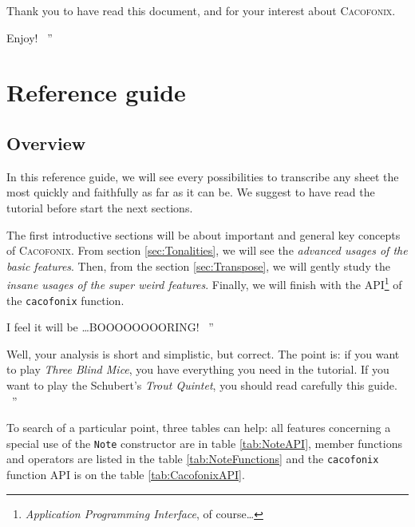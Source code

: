 \documentclass{article}
\newcommand{\cacofonix}{\textsc{Cacofonix}\xspace}
\newcommand{\note}{\lstinline!Note!\xspace}
\newenvironment{meenv}{ \par \noindent \makebox[6em][r]{ \textcolor{mecolor}{Me}: `` --~}}{~''}
\newenvironment{myselfenv}{ \par \noindent \makebox[6em][r]{ \textcolor{myselfcolor}{Myself}: `` --~}}{~''}
\newcommand{ \me }[1]{%
\begin{meenv}%
	#1%
\end{meenv} }
\newcommand{ \myself }[1]{%
\begin{myselfenv}%
	#1%
\end{myselfenv} }
\begin{document}
Thank you to have read this document, and for your interest about \cacofonix.

\myself{Enjoy!}

\section{Reference guide}

\subsection{Overview}

In this reference guide, we will see every possibilities to transcribe any sheet the most quickly and faithfully as far as it can be. We suggest to have read the tutorial before start the next sections.

The first introductive sections will be about important and general key concepts of \cacofonix. From section \ref{sec:Tonalities}, we will see the \emph{advanced usages of the basic features}. Then, from the section \ref{sec:Transpose}, we will gently study the \emph{insane usages of the super weird features}. Finally, we will finish with the API\footnote{\emph{Application Programming Interface}, of course\dots} of the \lstinline!cacofonix! function.

\me{I feel it will be \dots BOOOOOOOORING!}
\myself{Well, your analysis is short and simplistic, but correct. The point is: if you want to play \emph{Three Blind Mice}, you have everything you need in the tutorial. If you want to play the Schubert's \emph{Trout Quintet}, you should read carefully this guide.}

To search of a particular point, three tables can help: all features concerning a special use of the \note constructor are in table \ref{tab:NoteAPI}, member functions and operators are listed in the table \ref{tab:NoteFunctions} and the \lstinline!cacofonix! function API is on the table \ref{tab:CacofonixAPI}.
\end{document}
